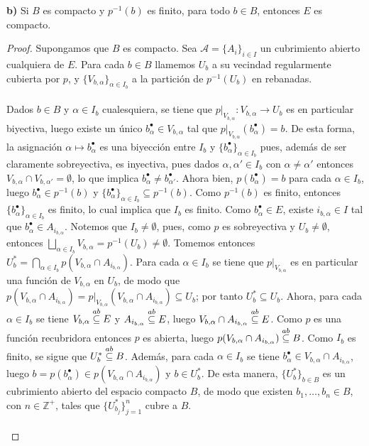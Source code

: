 \vspace{2.5em}\textbf{b)} Si $B$ es compacto y $p^{-1}(b)$ es finito, para todo $b\in B$, entonces $E$ es compacto.
\begin{proof}       
   Supongamos que $B$ es compacto. Sea $\mathcal{A}=\{A_i\}_{i\in I}$ un cubrimiento abierto cualquiera de $E$. Para cada $b\in B$ llamemos $U_b$ a su vecindad regularmente cubierta por $p$, y $\{V_{b,\alpha}\}_{\alpha\in I_b}$ a la partición de $p^{-1}(U_b)$ en rebanadas.\\\\ 
   Dados $b\in B$ y $\alpha\in I_b$ cualesquiera, se tiene que $p|_{V_{b,\alpha}}:V_{b,\alpha}\to U_b$ es en particular biyectiva, luego existe un único $b^\bullet_\alpha\in V_{b,\alpha}$ tal que $p|_{V_{b,\alpha}}(b^\bullet_\alpha)=b$. De esta forma, la asignación $\alpha\mapsto b^\bullet_\alpha$ es una biyección entre $I_b$ y $\{b^\bullet_\alpha\}_{\alpha\in I_b}$ pues, además de ser claramente sobreyectiva, es inyectiva, pues dados $\alpha,\alpha'\in I_b$ con $\alpha\neq\alpha'$ entonces $V_{b,\alpha}\cap V_{b,\alpha'}=\emptyset$, lo que implica $b^\bullet_\alpha\neq b^\bullet_{\alpha'}$. Ahora bien, $p(b^\bullet_\alpha)=b$ para cada $\alpha\in I_b$, luego $b^\bullet_\alpha\in p^{-1}(b)$ y $\{b^\bullet_\alpha\}_{\alpha\in I_b}\subseteq p^{-1}(b)$. Como $p^{-1}(b)$ es finito, entonces $\{b^\bullet_\alpha\}_{\alpha\in I_b}$ es finito, lo cual implica que $I_b$ es finito. Como $b^\bullet_\alpha\in E$, existe $i_{b,\alpha}\in I$ tal que $b^\bullet_\alpha\in A_{i_{b,\alpha}}$. Notemos que $I_b\ne \emptyset$, pues, como $p$ es sobreyectiva y $U_b\ne\emptyset$, entonces $\bigsqcup_{\alpha\in I_b}V_{b,\alpha}=p^{-1}(U_b)\ne \emptyset$. Tomemos entonces $U_b^*=\bigcap_{\alpha\in I_b}p(V_{b,\alpha}\cap A_{i_{b,\alpha}})$. Para cada $\alpha\in I_b$ se tiene que $p|_{V_{b,\alpha}}$ es en particular una función de $V_{b,\alpha}$ en $U_b$, de modo que $p\left( V_{b,\alpha}\cap A_{i_{b,\alpha}}\right)=p|_{V_{b,\alpha}}\left( V_{b,\alpha} \cap A_{i_{b,\alpha}}\right)\subseteq U_b$; por tanto $U_b^*\subseteq U_b$. Ahora, para cada $\alpha\in I_b$ se tiene $V_{b,\alpha}\stackrel{ab}{\subseteq} E$ y $A_{i_{b,\alpha}}\stackrel{ab}{\subseteq} E$, luego $V_{b,\alpha}\cap A_{i_{b,\alpha}}\stackrel{ab}{\subseteq} E$. Como $p$ es una función recubridora entonces $p$ es abierta, luego $p(V_{b,\alpha}\cap A_{i_{b,\alpha}})\stackrel{ab}{\subseteq} B$. Como $I_b$ es finito, se sigue que $U_b^*\stackrel{ab}{\subseteq} B$. Además, para cada $\alpha\in I_b$ se tiene $b^\bullet_\alpha\in V_{b,\alpha}\cap A_{i_{b,\alpha}}$, luego $b=p(b^\bullet_\alpha)\in p(V_{b,\alpha}\cap A_{i_{b,\alpha}})$ y $b\in U_b^*$. De esta manera, $\{U_b^*\}_{b\in B}$ es un cubrimiento abierto del espacio compacto $B$, de modo que existen $b_1,\dots,b_n\in B$, con $n\in\mathbb{Z}^+$, tales que $\{U_{b_j}^*\}_{j=1}^{n}$ cubre a $B$.\\\\

\end{proof}
